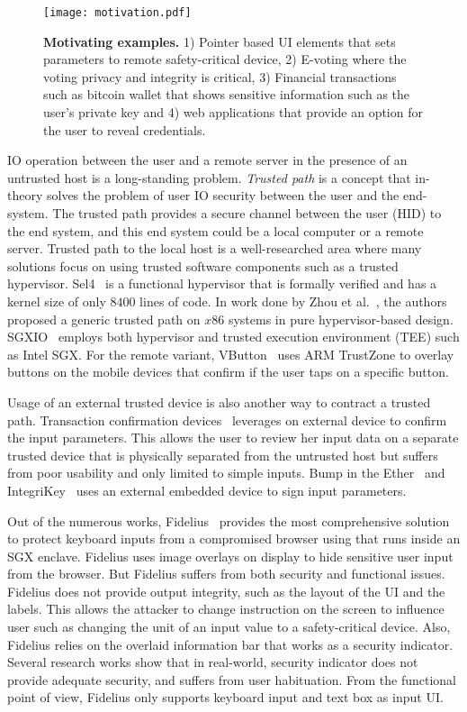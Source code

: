 \begin{figure}[t]
\centering
\texttt{[image: motivation.pdf]}
\caption{\textbf{Motivating examples.} 1) Pointer based UI elements that sets parameters to remote safety-critical device, 2) E-voting where the voting privacy and integrity is critical, 3) Financial transactions such as bitcoin wallet that shows sensitive information such as the user's private key and 4) web applications that provide an option for the user to reveal credentials.}
\spacesave
\label{fig:motivation}
\centering
\end{figure}


IO operation between the user and a remote server in the presence of an untrusted host is a long-standing problem. \emph{Trusted path} is a concept that in-theory solves the problem of user IO security between the user and the end-system. The trusted path provides a secure channel between the user (HID) to the end system, and this end system could be a local computer or a remote server. Trusted path to the local host is a well-researched area where many solutions focus on using trusted software components such as a trusted hypervisor. Sel4~\cite{klein2009sel4} is a functional hypervisor that is formally verified and has a kernel size of only $8400$ lines of code. In work done by Zhou et al.~\cite{zhou2012building}, the authors proposed a generic trusted path on $x86$ systems in pure hypervisor-based design. SGXIO~\cite{weiser2017sgxio} employs both hypervisor and trusted execution environment (TEE) such as Intel SGX. For the remote variant, VButton~\cite{li2018vbutton} uses ARM TrustZone to overlay buttons on the mobile devices that confirm if the user taps on a specific button. 

Usage of an external trusted device is also another way to contract a trusted path. Transaction confirmation devices~\cite{filyanov2011uni,weigold2011secure} leverages on external device to confirm the input parameters. This allows the user to review her input data on a separate trusted device that is physically separated from the untrusted host but suffers from poor usability and only limited to simple inputs. Bump in the Ether~\cite{McCPerRei2006} and IntegriKey~\cite{IntegriKey} uses an external embedded device to sign input parameters.

 Out of the numerous works, Fidelius~\cite{Fidelius} provides the most comprehensive solution to protect keyboard inputs from a compromised browser using \js that runs inside an SGX enclave. Fidelius uses image overlays on display to hide sensitive user input from the browser. But Fidelius suffers from both security and functional issues. Fidelius does not provide output integrity, such as the layout of the UI and the labels. This allows the attacker to change instruction on the screen to influence user such as changing the unit of an input value to a safety-critical device. Also, Fidelius relies on the overlaid information bar that works as a security indicator. Several research works show that in real-world, security indicator does not provide adequate security, and suffers from user habituation. From the functional point of view, Fidelius only supports keyboard input and text box as input UI.
 
